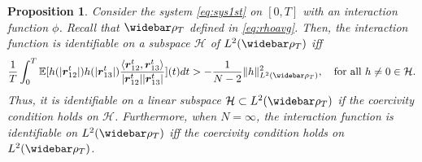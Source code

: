 \documentclass[]{elsarticle}
\def\E{\mathbb{E}}
\newcommand{\wbar}\widebar
\newcommand{\mbf}[1]{\boldsymbol{#1}}
\newcommand{\br}{\mbf{r}}
\newcommand{\hypspace}{\mathcal{H}}
\newtheorem{proposition}[theorem]{Proposition}
\numberwithin{equation}{section}
\numberwithin{theorem}{section}
\begin{document}
\begin{proposition}\label{propID_CC}
Consider the system  \eqref{eq:sys1st} on $[0,T]$ with an interaction function $\phi$. Recall that $\wbar \rho_T$ defined in \eqref{eq:rhoavg}. Then, the interaction function is identifiable on a subspace $\hypspace$ of $L^2(\wbar\rho_T)$ iff
  \begin{align}\label{eq:identifiabitly} 
\frac{1}{T}\int_{0}^T   \E[ h(|\br_{12}^t|) h(|\br_{13}^t|)\frac{\langle \br_{12}^t,\br_{13}^t \rangle}{|\br_{12}^t||\br_{13}^t|} ](t)dt
 > -  \frac{1}{N-2} \|h\|_{L^2(\wbar \rho_T)}^2, \quad \text{for all } h\neq 0\in \hypspace.
 \end{align}
Thus, it is identifiable on a linear subspace $\hypspace\subset L^2(\wbar\rho_T)$ if the coercivity condition holds on $\hypspace$. Furthermore, when $N=\infty$, the interaction function is identifiable on $L^2(\wbar \rho_T)$ iff the coercivity condition holds on  $L^2(\wbar \rho_T)$. 
\end{proposition}
\end{document}
